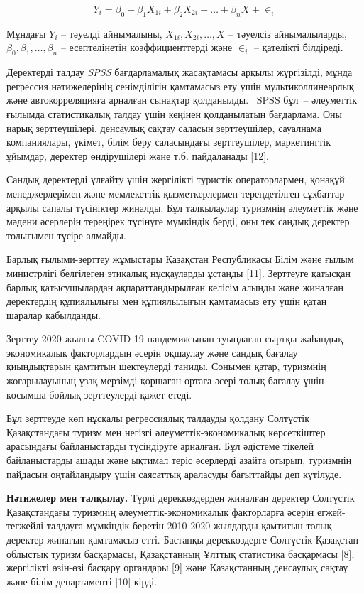 \begin{equation}
Y_{i} = \beta_{0} + \beta_{1}X_{1i} + \beta_{2}X_{2i} + \ldots + \beta_{n}X_{} + \in_{i}
\end{equation}

\begin{multicols}{2}
Мұндағы \(Y_{i}\) -- тәуелді айнымалыны, \(X_{1i},X_{2i},\ldots,X_{}\)
-- тәуелсіз айнымалыларды, \(\beta_{0},\beta_{1},\ldots,\beta_{n}\) --
есептелінетін коэффициенттерді және \(\in_{i}\) -- қателікті білдіреді.

Деректерді талдау \emph{SPSS} бағдарламалық жасақтамасы арқылы
жүргізілді, мұнда регрессия нәтижелерінің сенімділігін қамтамасыз ету
үшін мультиколлинеарлық және автокорреляцияға арналған сынақтар
қолданылды. ~SPSS бұл~-- әлеуметтік ғылымда статистикалық талдау үшін
кеңінен қолданылатын бағдарлама. Оны нарық зерттеушілері, денсаулық
сақтау саласын зерттеушілер, сауалнама компаниялары, үкімет, білім беру
саласындағы зерттеушілер, маркетингтік ұйымдар, деректер өндірушілері
және т.б. пайдаланады {[}12{]}.

Сандық деректерді ұлғайту үшін жергілікті туристік операторлармен,
қонақүй менеджерлерімен және мемлекеттік қызметкерлермен тереңдетілген
сұхбаттар арқылы сапалы түсініктер жиналды. Бұл талқылаулар туризмнің
әлеуметтік және мәдени әсерлерін тереңірек түсінуге мүмкіндік берді, оны
тек сандық деректер толығымен түсіре алмайды.

Барлық ғылыми-зерттеу жұмыстары Қазақстан Республикасы Білім және ғылым
министрлігі белгілеген этикалық нұсқауларды ұстанды {[}11{]}. Зерттеуге
қатысқан барлық қатысушылардан ақпараттандырылған келісім алынды және
жиналған деректердің құпиялылығы мен құпиялылығын қамтамасыз ету үшін
қатаң шаралар қабылданды.

Зерттеу 2020 жылғы COVID-19 пандемиясынан туындаған сыртқы жаһандық
экономикалық факторлардың әсерін оқшаулау және сандық бағалау
қиындықтарын қамтитын шектеулерді таниды. Сонымен қатар, туризмнің
жоғарылауының ұзақ мерзімді қоршаған ортаға әсері толық бағалау үшін
қосымша бойлық зерттеулерді қажет етеді.

Бұл зерттеуде көп нұсқалы регрессиялық талдауды қолдану Солтүстік
Қазақстандағы туризм мен негізгі әлеуметтік-экономикалық көрсеткіштер
арасындағы байланыстарды түсіндіруге арналған. Бұл әдістеме тікелей
байланыстарды ашады және ықтимал теріс әсерлерді азайта отырып,
туризмнің пайдасын оңтайландыру үшін саясаттық араласуды бағыттайды деп
күтілуде.

{\bfseries Нәтижелер мен талқылау.} Түрлі дереккөздерден жиналған деректер
Солтүстік Қазақстандағы туризмнің әлеуметтік-экономикалық факторларға
әсерін егжей-тегжейлі талдауға мүмкіндік беретін 2010-2020 жылдарды
қамтитын толық деректер жинағын қамтамасыз етті. Бастапқы дереккөздерге
Солтүстік Қазақстан облыстық туризм басқармасы, Қазақстанның Ұлттық
статистика басқармасы {[}8{]}, жергілікті өзін-өзі басқару органдары
{[}9{]} және Қазақстанның денсаулық сақтау және білім департаменті
{[}10{]} кірді.


\end{multicols}
